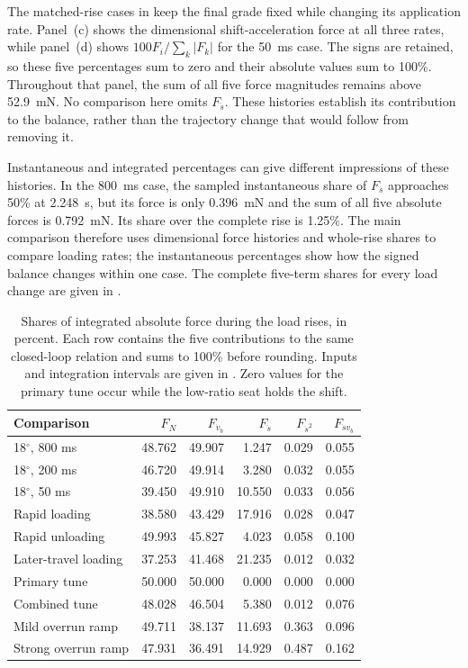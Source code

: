 \documentclass[11pt]{report}
\numberwithin{equation}{section}
\begin{document}
The matched-rise cases in  keep the
final grade fixed while changing its application rate. Panel~(c) shows
the dimensional shift-acceleration force at all three rates, while
panel~(d) shows \(100F_i/\sum_k|F_k|\) for the \SI{50}{ms} case.
The signs are retained, so these five percentages sum to zero and their
absolute values sum to 100\%. Throughout that panel, the sum of all
five force magnitudes remains above \SI{52.9}{mN}.
No comparison here omits \(F_{\ddot s}\). These histories establish
its contribution to the balance, rather than the trajectory change that
would follow from removing it.

Instantaneous and integrated percentages can give different impressions
of these histories. In the \SI{800}{ms} case, the sampled instantaneous
share of \(F_{\ddot s}\) approaches 50\% at \SI{2.248}{s}, but its
force is only \SI{0.396}{mN} and the sum of all five absolute forces is
\SI{0.792}{mN}. Its share over the complete rise is 1.25\%.
The main comparison therefore uses dimensional force histories and
whole-rise shares to compare loading rates; the instantaneous percentages
show how the signed balance changes within one case. The complete five-term shares for every
load change are given in .

\begin{table}[H]
 \centering\small
 \setlength{\tabcolsep}{4pt}\renewcommand{\arraystretch}{1.15}
 \begin{tabular}{@{}lrrrrr@{}}
 \toprule
 Comparison & \(F_N\) & \(F_{\dot v_b}\) & \(F_{\ddot s}\)
 & \(F_{\dot s^2}\) & \(F_{\dot s v_b}\) \\
 \midrule
18$^\circ$, 800 ms & 48.762 & 49.907 & 1.247 & 0.029 & 0.055 \\
18$^\circ$, 200 ms & 46.720 & 49.914 & 3.280 & 0.032 & 0.055 \\
18$^\circ$, 50 ms & 39.450 & 49.910 & 10.550 & 0.033 & 0.056 \\
Rapid loading & 38.580 & 43.429 & 17.916 & 0.028 & 0.047 \\
Rapid unloading & 49.993 & 45.827 & 4.023 & 0.058 & 0.100 \\
Later-travel loading & 37.253 & 41.468 & 21.235 & 0.012 & 0.032 \\
Primary tune & 50.000 & 50.000 & 0.000 & 0.000 & 0.000 \\
Combined tune & 48.028 & 46.504 & 5.380 & 0.012 & 0.076 \\
Mild overrun ramp & 49.711 & 38.137 & 11.693 & 0.363 & 0.096 \\
Strong overrun ramp & 47.931 & 36.491 & 14.929 & 0.487 & 0.162 \\
 \bottomrule
 \end{tabular}
 \caption{Shares of integrated absolute force during the load rises, in
 percent. Each row contains the five contributions to the same closed-loop
 relation and sums to 100\% before rounding. Inputs and integration
 intervals are given in . Zero values
 for the primary tune occur while the low-ratio seat holds the shift.}
 \label{tab:belt_load_rise_shares}
\end{table}
\end{document}
